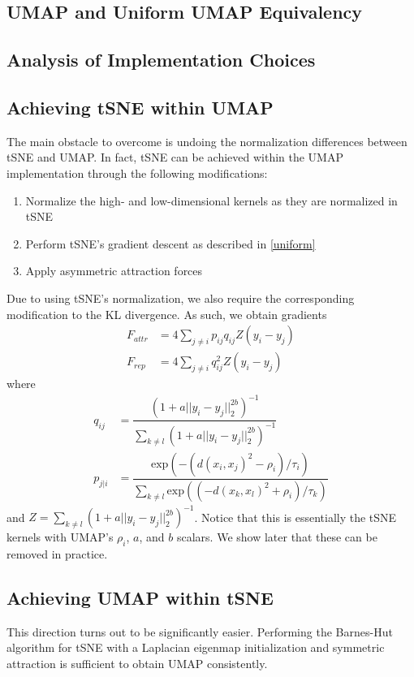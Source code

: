 \documentclass{article}
\theoremstyle{definition}
\begin{document}
\subsection{UMAP and Uniform UMAP Equivalency}

\subsection{Analysis of Implementation Choices}

\subsection{Achieving tSNE within UMAP}
The main obstacle to overcome is undoing the normalization
differences between tSNE and UMAP. In fact, tSNE can be achieved within the UMAP implementation through the following modifications:
\begin{enumerate}
    \item Normalize the high- and low-dimensional kernels as they are normalized in tSNE
    \item Perform tSNE's gradient descent as described in \ref{uniform}
    \item Apply asymmetric attraction forces
\end{enumerate}
Due to using tSNE's normalization, we also require the corresponding modification to the KL divergence. As such, we obtain gradients
\begin{align*}
    F_{attr} &= 4 \sum_{j \neq i} p_{ij} q_{ij} Z (y_i - y_j) \\
   F_{rep} &= 4 \sum_{j \neq i} q_{ij}^2 Z (y_i - y_j)
\end{align*}
   where
\begin{align*}
   q_{ij} &= \dfrac{(1 + a ||y_i - y_j||_2^{2b})^{-1}}{\sum_{k \neq l} (1 + a ||y_i - y_j||_2^{2b})^{-1}} \\
    p_{j|i} &= \dfrac{\text{exp}( -(d(x_i, x_j)^2 - \rho_i) / \tau_i)}{\sum_{k \neq l} \text{exp}( (-d(x_k, x_l)^2 + \rho_i) / \tau_k)}
\end{align*}
   and $Z = \sum_{k \neq l} (1 + a ||y_i
   - y_j||_2^{2b})^{-1}$. Notice that this is essentially the tSNE kernels with UMAP's $\rho_i$, $a$, and $b$ scalars. We show later that these can be removed
   in practice.

\subsection{Achieving UMAP within tSNE}
This direction turns out to be significantly easier. Performing the Barnes-Hut algorithm for tSNE with a Laplacian eigenmap initialization and symmetric
attraction is sufficient to obtain UMAP consistently.
\end{document}
